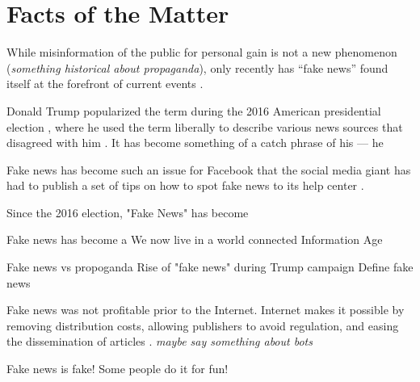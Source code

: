 

\section{Facts of the Matter}


While misinformation of the public for personal gain is not a new phenomenon (\emph{something historical about propaganda}), only recently has ``fake news'' found itself at the forefront of current events \cite{telegraph_fake_news}.

Donald Trump popularized the term during the 2016 American presidential election \cite{tc_what_is_fake_news}, where he used the term liberally to describe various news sources that disagreed with him \cite{tc_what_is_fake_news}. It has become something of a catch phrase of his --- he 

Fake news has become such an issue for Facebook that the social media giant has had to publish a set of tips on how to spot fake news to its help center \cite{fb_spot_fake_news}.

Since the 2016 election, "Fake News" has become 
% 

Fake news has become a 
We now live in a world connected
Information Age

Fake news vs propoganda
Rise of "fake news" during Trump campaign
Define fake news

Fake news was not profitable prior to the Internet.
Internet makes it possible by removing distribution costs, allowing publishers to avoid regulation, and easing the dissemination of articles \cite{telegraph_fake_news}. \emph{maybe say something about bots}


Fake news is fake! \cite{tc_what_is_fake_news}
Some people do it for fun! \cite{cbs_fake_news}
